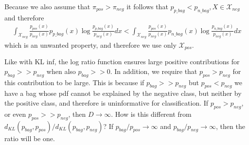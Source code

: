 Because we also assume that $\pi_{pos} > \pi_{neg}$ it follows that $p_{p \_ bag} < p_{n \_ bag}, X \in \mathcal{X}_{neg}$ and therefore 
\begin{align}
  \int_{\mathcal{X}_{neg}} \frac{p_{pos}(x)}{p_{neg}(x)} p_{p\_bag}(x) \log \frac{p_{p\_bag}(x)}{p_{neg}(x)} dx < \int_{\mathcal{X}_{neg}} \frac{p_{pos}(x)}{p_{neg}(x)} p_{n \_ bag}(x) \log \frac{p_{n \_bag}(x)}{p_{neg}(x)} dx
\end{align}
which is an unwanted property, and therefore we use only $\mathcal{X}_{pos}$.

Like with KL inf, the log ratio function ensures large positive contributions for $p_{bag} >> p_{neg}$ when also $p_{bag} >> 0$. 
In addition, we require that $p_{pos} > p_{neg}$ for this contribution to be large. 
This is because if $p_{bag} >> p_{neg}$ but $p_{pos} < p_{neg}$ we have a bag whose pdf cannot be explained by the negative class, but neither by the positive class, and therefore is uninformative for classification. 
If $p_{pos} > p_{neg}$, or even $p_{pos} >> p_{neg}$, then $D \rightarrow \infty$.
How is this different from $d_{KL}(p_{bag},p_{pos})/d_{KL}(p_{bag},p_{neg})$?
If $p_{bag}/p_{pos} \rightarrow \infty$ and $p_{bag}/p_{neg} \rightarrow \infty$, then the ratio will be one. 



